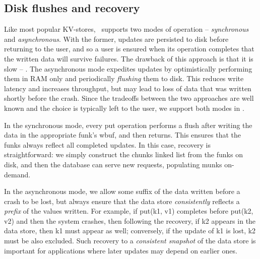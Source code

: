 \subsection{Disk flushes and recovery}
\label{ssec:flush-recovery}

Like most popular KV-stores, \sys\ supports two modes of operation -- \emph{synchronous} and \emph{asynchronous}. 
With the former,  updates are persisted to disk before returning to the user, and so a user is ensured when its operation
completes that the written data will survive failures. The drawback of this approach is that it is slow -- . 
The asynchronous mode expedites updates by optimistically performing them in
RAM only and periodically \emph{flushing} them to disk. This reduces write latency and increases throughput, but 
may lead to loss of data that was written shortly before the crash. Since the tradeoffs between the two approaches are 
well known and the choice is typically left to the user, we support both modes in \sys.

In the synchronous mode, every put operation performs a flush after writing the data in the appropriate funk's wbuf, and then returns. 
This ensures that the funks always reflect all completed updates. In this case, recovery is straightforward: we simply construct
the chunks linked list from the funks on disk, and then the database can serve new requests, populating munks on-demand.  

In the asynchronous mode, we allow some suffix of the  data written before a crash to be lost, but always 
ensure that the data store \emph{consistently} reflects a \emph{prefix} of the  values written.
For example, if put(k1, v1) completes before put(k2, v2) and then the system crashes, then following the recovery, 
if k2 appears in the data store, then k1 must appear as well; conversely, if the update of k1 is lost, k2 must be also excluded.
Such recovery to a \emph{consistent snapshot} of the data store is important for applications where later updates may depend on earlier ones. 










